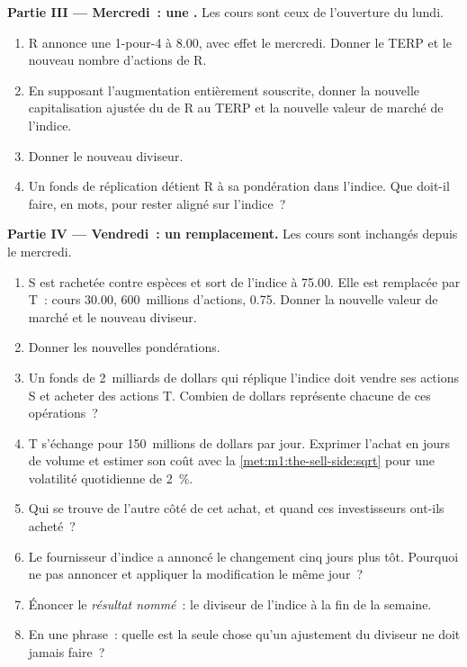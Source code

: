 \begin{problem}
\medskip\noindent\textbf{Partie III --- Mercredi~: une .}
Les cours sont ceux de l'ouverture du lundi.
\begin{enumerate}[resume]
\item R annonce une  1-pour-4 à 8.00, avec effet le mercredi. Donner
le TERP et le nouveau nombre d'actions de R.
\item En supposant l'augmentation entièrement souscrite, donner la nouvelle
capitalisation ajustée du  de R au TERP et la nouvelle valeur de marché de l'indice.
\item Donner le nouveau diviseur.
\item Un fonds de réplication détient R à sa pondération dans l'indice. Que doit-il faire, en mots,
pour rester aligné sur l'indice~?
\end{enumerate}

\medskip\noindent\textbf{Partie IV --- Vendredi~: un remplacement.}
Les cours sont inchangés depuis le mercredi.
\begin{enumerate}[resume]
\item S est rachetée contre espèces et sort de l'indice à 75.00. Elle est remplacée
par T~: cours 30.00, 600~millions d'actions,  0.75. Donner la nouvelle
valeur de marché et le nouveau diviseur.
\item Donner les nouvelles pondérations.
\item Un fonds de 2~milliards de dollars qui réplique l'indice doit vendre ses actions S
et acheter des actions T. Combien de dollars représente chacune de ces opérations~?
\item T s'échange pour 150~millions de dollars par jour. Exprimer l'achat en jours
de volume et estimer son coût avec la \cref{met:m1:the-sell-side:sqrt} pour une
volatilité quotidienne de 2~\%.
\item Qui se trouve de l'autre côté de cet achat, et quand ces investisseurs ont-ils acheté~?
\item Le fournisseur d'indice a annoncé le changement cinq jours plus tôt. Pourquoi ne pas
annoncer et appliquer la modification le même jour~?
\item Énoncer le \emph{résultat nommé}~: le diviseur de l'indice à la fin de la
semaine.
\item En une phrase~: quelle est la seule chose qu'un ajustement du diviseur ne doit
jamais faire~?
\end{enumerate}
\end{problem}

